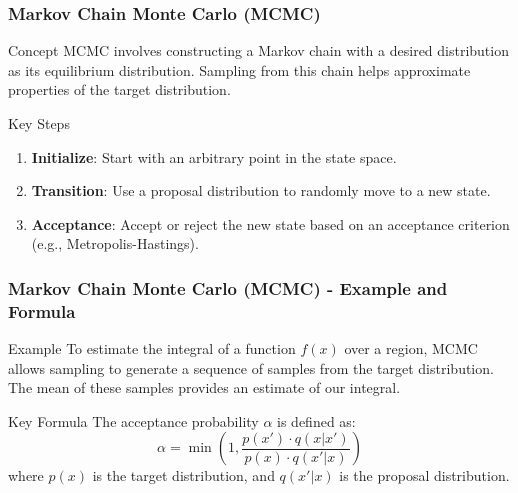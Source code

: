\documentclass[aspectratio=169]{beamer}
\begin{document}
\begin{frame}[fragile]
    \frametitle{Markov Chain Monte Carlo (MCMC)}
    
    \begin{block}{Concept}
        MCMC involves constructing a Markov chain with a desired distribution as its equilibrium distribution. Sampling from this chain helps approximate properties of the target distribution.
    \end{block}
    
    \begin{block}{Key Steps}
        \begin{enumerate}
            \item \textbf{Initialize}: Start with an arbitrary point in the state space.
            \item \textbf{Transition}: Use a proposal distribution to randomly move to a new state.
            \item \textbf{Acceptance}: Accept or reject the new state based on an acceptance criterion (e.g., Metropolis-Hastings).
        \end{enumerate}
    \end{block}
\end{frame}

\begin{frame}[fragile]
    \frametitle{Markov Chain Monte Carlo (MCMC) - Example and Formula}
    
    \begin{block}{Example}
        To estimate the integral of a function \( f(x) \) over a region, MCMC allows sampling to generate a sequence of samples from the target distribution. The mean of these samples provides an estimate of our integral.
    \end{block}
    
    \begin{block}{Key Formula}
        The acceptance probability \( \alpha \) is defined as:
        \begin{equation}
            \alpha = \min\left(1, \frac{p(x') \cdot q(x|x')}{p(x) \cdot q(x'|x)}\right)
        \end{equation}
        where \( p(x) \) is the target distribution, and \( q(x'|x) \) is the proposal distribution.
    \end{block}
\end{frame}
\end{document}
